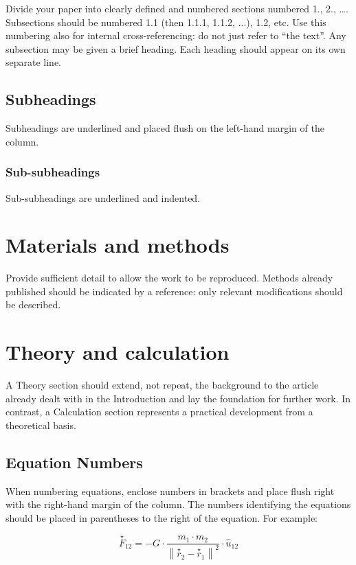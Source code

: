 \documentclass[]{iac}
\begin{document}
Divide your paper into clearly defined and numbered sections numbered 1., 2., …. Subsections should be numbered 1.1 (then 1.1.1, 1.1.2, ...), 1.2, etc. Use this numbering also for internal cross-referencing: do not just refer to “the text”. Any subsection may be given a brief heading. Each heading should appear on its own separate line.

\subsection{Subheadings}
Subheadings are underlined and placed flush on the left-hand margin of the column.

\subsubsection{Sub-subheadings}
Sub-subheadings are underlined and indented.

\section{Materials and methods}
Provide sufficient detail to allow the work to be reproduced. Methods already published should be indicated by a reference: only relevant modifications should be described.

\section{Theory and calculation}
A Theory section should extend, not repeat, the background to the article already dealt with in the Introduction and lay the foundation for further work. In contrast, a Calculation section represents a practical development from a theoretical basis.

\subsection{Equation Numbers}
When numbering equations, enclose numbers in brackets and place flush right with the right-hand margin of the column. The numbers identifying the equations should be placed in parentheses to the right of the equation. For example:

\begin{equation}
\stackrel{\star}{F}_{12} = -G \cdot \frac{ m_1 \cdot m_2 }{ \left\|\stackrel{\star}{r}_2 - \stackrel{\star}{r}_1\right\|^2 } \cdot \hat{u}_{12}
\end{equation}
\end{document}
